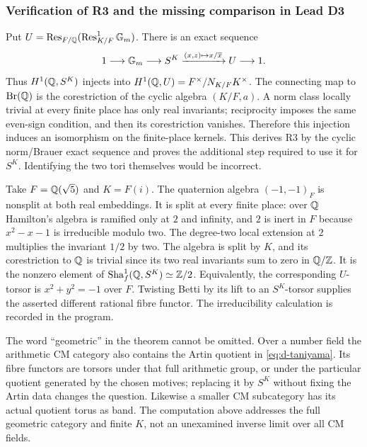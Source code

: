 \subsubsection*{Verification of R3 and the missing comparison in Lead D3}
Put $U=\operatorname{Res}_{F/\mathbb Q}(\operatorname{Res}^1_{K/F}{\mathbb G_m})$.  There is an exact sequence
\[
 1\longrightarrow{\mathbb G_m}\longrightarrow S^K
       \xrightarrow{(x,z)\mapsto x/\overline x}U\longrightarrow1.
\]
Thus $H^1(\mathbb Q,S^K)$ injects into
$H^1(\mathbb Q,U)=F^\times/N_{K/F}K^\times$.  The connecting map to
$\operatorname{Br}(\mathbb Q)$ is the corestriction of the cyclic algebra
$(K/F,a)$.  A norm class locally trivial at every finite place has
only real invariants; reciprocity imposes the same even-sign
condition, and then its corestriction vanishes.  Therefore this
injection induces an isomorphism on the finite-place kernels.
This derives R3 by the cyclic norm/Brauer exact sequence and proves
the additional step required to use it for $S^K$.  Identifying the
two tori themselves would be incorrect.

\begin{example}
\label{ex:d-non-betti}
Take $F=\mathbb Q(\sqrt5)$ and $K=F(i)$.  The quaternion algebra
$(-1,-1)_F$ is nonsplit at both real embeddings.  It is split at
every finite place: over $\mathbb Q$ Hamilton's algebra is ramified only
at $2$ and infinity, and $2$ is inert in $F$ because
$x^2-x-1$ is irreducible modulo two.  The degree-two local extension
at $2$ multiplies the invariant $1/2$ by two.  The algebra is split
by $K$, and its corestriction to $\mathbb Q$ is trivial since its two real
invariants sum to zero in $\mathbb Q/\mathbb Z$.  It is the nonzero element of
$\mathop{\mathrm{Sha}}^1_f(\mathbb Q,S^K)\simeq\mathbb Z/2$.  Equivalently, the corresponding
$U$-torsor is $x^2+y^2=-1$ over $F$.  Twisting Betti by its lift to
an $S^K$-torsor supplies the asserted different rational fibre
functor.  The irreducibility calculation is recorded in the program.
\end{example}

The word ``geometric'' in the theorem cannot be omitted.  Over a
number field the arithmetic CM category also contains the Artin
quotient in \eqref{eq:d-taniyama}.  Its fibre functors are torsors
under that full arithmetic group, or under the particular quotient
generated by the chosen motives; replacing it by $S^K$ without
fixing the Artin data changes the question.  Likewise a smaller CM
subcategory has its actual quotient torus as band.  The computation
above addresses the full geometric category and finite $K$, not
an unexamined inverse limit over all CM fields.

